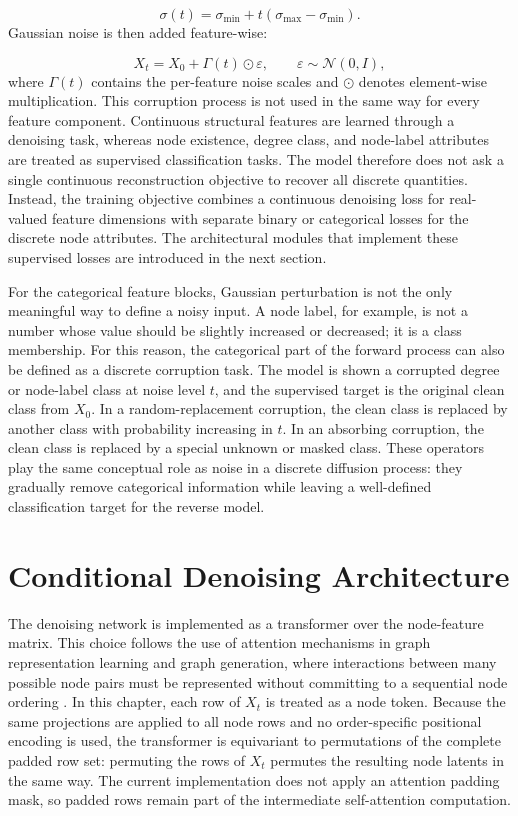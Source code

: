\[
    \sigma(t) = \sigma_{\min}
    + t(\sigma_{\max}-\sigma_{\min}).
\]
Gaussian noise is then added feature-wise:

\[
    X_t = X_0 + \Gamma(t) \odot \varepsilon,
    \qquad
    \varepsilon \sim \mathcal{N}(0,I),
\]
where \(\Gamma(t)\) contains the per-feature noise scales and \(\odot\) denotes
element-wise multiplication. This corruption process is not used in the same
way for every feature component. Continuous structural features are learned through a
denoising task, whereas node existence, degree class, and node-label attributes
are treated as supervised classification tasks. The model therefore does not ask
a single continuous reconstruction objective to recover all discrete quantities.
Instead, the training objective combines a continuous denoising loss for
real-valued feature dimensions with separate binary or categorical losses for the
discrete node attributes. The architectural modules that implement these
supervised losses are introduced in the next section.

For the categorical feature blocks, Gaussian perturbation is not the only
meaningful way to define a noisy input. A node label, for example, is not a
number whose value should be slightly increased or decreased; it is a class
membership. For this reason, the categorical part of the forward process can
also be defined as a discrete corruption task. The model is shown a corrupted
degree or node-label class at noise level \(t\), and the supervised target is
the original clean class from \(X_0\). In a random-replacement corruption, the
clean class is replaced by another class with probability increasing in \(t\).
In an absorbing corruption, the clean class is replaced by a special unknown or
masked class. These operators play the same conceptual role as noise in a
discrete diffusion process: they gradually remove categorical information while
leaving a well-defined classification target for the reverse model.

\section{Conditional Denoising Architecture}
\label{sec:generator:architecture}

The denoising network is implemented as a transformer over the node-feature
matrix. This choice follows the use of
attention mechanisms in graph representation learning and graph generation,
where interactions between many possible node pairs must be represented without
committing to a sequential node ordering
\citep{vaswani2017attention,dwivedi2021graph,ying2021transformers,
rampavsek2022recipe,vignac2022digress}. In this chapter, each row of
\(X_t\) is treated as a node token. Because the same projections are applied to
all node rows and no order-specific positional encoding is used, the
transformer is equivariant to permutations of the complete padded row set:
permuting the rows of \(X_t\) permutes the resulting node latents in the same
way. The current
implementation does not apply an attention padding mask, so padded rows remain
part of the intermediate self-attention computation.


